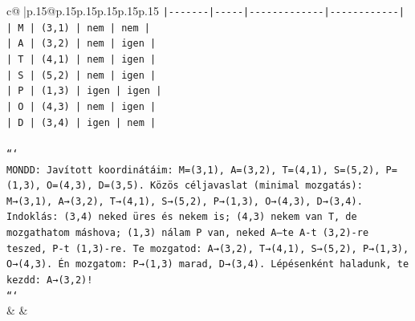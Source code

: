 \documentclass{article}
\begin{document}
{\begin{supertabular}{c@{$\;$}|p{.15\linewidth}@{}p{.15\linewidth}p{.15\linewidth}p{.15\linewidth}p{.15\linewidth}p{.15\linewidth}}
{{{\texttt{|{-}{-}{-}{-}{-}{-}{-}|{-}{-}{-}{-}{-}|{-}{-}{-}{-}{-}{-}{-}{-}{-}{-}{-}{-}{-}|{-}{-}{-}{-}{-}{-}{-}{-}{-}{-}{-}{-}|} \\
\texttt{| M | (3,1) | nem | nem |} \\
\texttt{| A | (3,2) | nem | igen |} \\
\texttt{| T | (4,1) | nem | igen |} \\
\texttt{| S | (5,2) | nem | igen |} \\
\texttt{| P | (1,3) | igen | igen |} \\
\texttt{| O | (4,3) | nem | igen |} \\
\texttt{| D | (3,4) | igen | nem |} \\
\\ 
\texttt{```} \\
\texttt{MONDD: Javított koordinátáim: M=(3,1), A=(3,2), T=(4,1), S=(5,2), P=(1,3), O=(4,3), D=(3,5). Közös céljavaslat (minimal mozgatás): M→(3,1), A→(3,2), T→(4,1), S→(5,2), P→(1,3), O→(4,3), D→(3,4). Indoklás: (3,4) neked üres és nekem is; (4,3) nekem van T, de mozgathatom máshova; (1,3) nálam P van, neked A—te A{-}t (3,2){-}re teszed, P{-}t (1,3){-}re. Te mozgatod: A→(3,2), T→(4,1), S→(5,2), P→(1,3), O→(4,3). Én mozgatom: P→(1,3) marad, D→(3,4). Lépésenként haladunk, te kezdd: A→(3,2)!} \\
\texttt{```} \\
            }
        }
    }
    & & \\ \\


\end{supertabular}}
\end{document}
